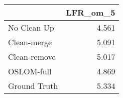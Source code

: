 \begin{tabular}{lr}
\toprule
{} & LFR_om_5 \\
\midrule
No Clean Up  &    4.561 \\
Clean-merge  &    5.091 \\
Clean-remove &    5.017 \\
OSLOM-full   &    4.869 \\
Ground Truth &    5.334 \\
\bottomrule
\end{tabular}
